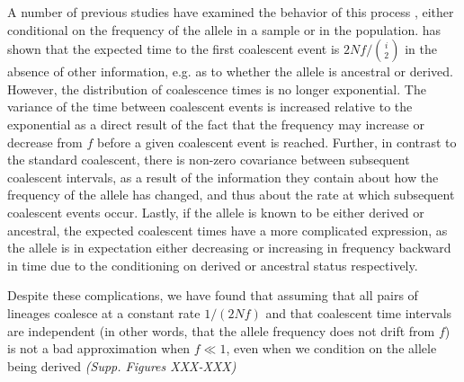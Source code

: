 \documentclass[a4paper,10pt]{article}
\newcommand{\jb}[1]{{\it\color{blue} (#1)} }
\begin{document}

A number of previous studies have examined the behavior of this process \citep{Wiuf1999,Wiuf:2000js,Patterson2005}, either conditional on the frequency of the allele in a sample or in the population. \cite{Wiuf:2000js} has shown that the expected time to the first coalescent event is $2 N f/ {i \choose 2}$ in the absence of other information, e.g. as to whether the allele is ancestral or derived. However, the distribution of coalescence times is no longer exponential. The variance of the time between coalescent events is increased relative to the exponential as a direct result of the fact that the frequency may increase or decrease from $f$ before a given coalescent event is reached. Further, in contrast to the standard coalescent, there is non-zero covariance between subsequent coalescent intervals, as a result of the information they contain about how the frequency of the allele has changed, and thus about the rate at which subsequent coalescent events occur. Lastly, if the allele is known to be either derived or ancestral, the expected coalescent times have a more complicated expression, as the allele is in expectation either decreasing or increasing in frequency backward in time due to the conditioning on derived or ancestral status respectively.

Despite these complications, we have found that assuming that all pairs of lineages coalesce at a constant rate $1/(2 N f)$ and that coalescent time intervals are independent (in other words, that the allele frequency does not drift from $f$) is not a bad approximation when $f \ll 1$, even when we condition on the allele being derived \jb{Supp. Figures XXX-XXX}
\end{document}
